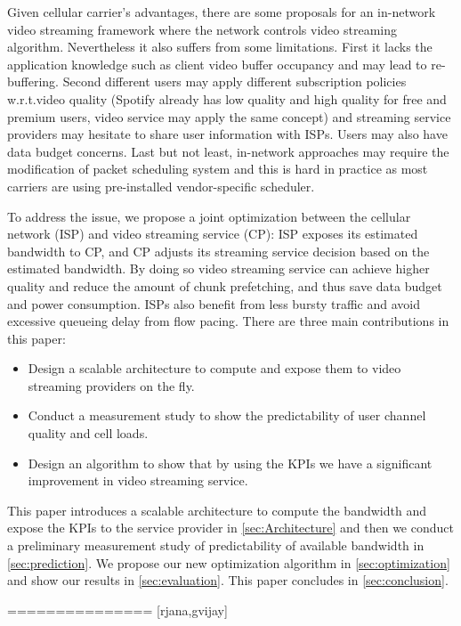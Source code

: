 Given cellular carrier's advantages, there are some proposals\cite{Avis} for an in-network video streaming framework where the network controls video streaming algorithm. 
Nevertheless it also suffers from some limitations. First it
lacks the application knowledge such as client video buffer occupancy and may lead to re-buffering. 
Second different users may apply different subscription
policies w.r.t.video quality (Spotify already has low quality and high quality for free and premium users, video service may apply the same concept) and streaming service providers may
hesitate to share user information with ISPs. Users may also have data budget concerns. Last
but not least, in-network approaches may require the modification of packet scheduling system and this
is hard in practice as most carriers are using pre-installed
vendor-specific scheduler. 

To address the issue, we propose a joint optimization between the cellular network (ISP) and video streaming service (CP): ISP exposes its estimated bandwidth to CP, and CP adjusts its streaming service decision based on the estimated bandwidth. By doing so video streaming service can achieve higher quality and reduce the amount of chunk prefetching, and thus save data budget and power consumption. ISPs also benefit from less bursty traffic and avoid excessive queueing delay from flow pacing. There are three main contributions in this paper:
\begin{itemize}
\item Design a scalable architecture to compute  and expose them to video streaming providers on the fly.
\item Conduct a measurement study to show the predictability of user channel quality and cell loads. 
\item Design an algorithm to show that by using the KPIs we have a significant improvement in video streaming service.
\end{itemize}

This paper introduces a scalable architecture to compute the bandwidth and expose the KPIs to the service provider in \autoref{sec:Architecture} and then we conduct a preliminary measurement study of predictability of available bandwidth in \autoref{sec:prediction}. We propose our new optimization algorithm in \autoref{sec:optimization} and show our results in \autoref{sec:evaluation}. This paper concludes in \autoref{sec:conclusion}. 


=============== [rjana,gvijay] 

